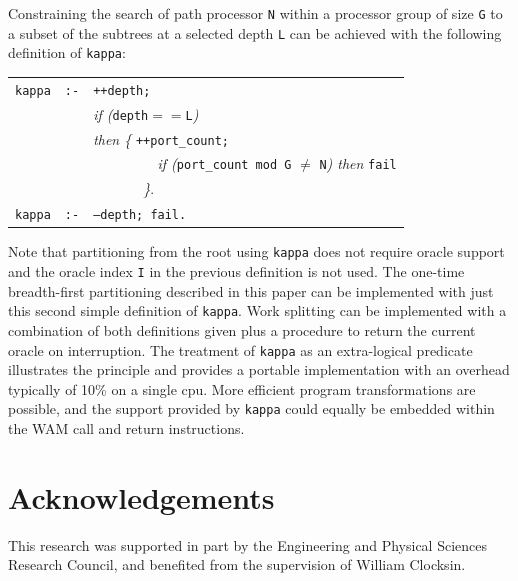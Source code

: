 \documentclass[a4paper,11pt,twoside]{article}
\begin{document}
Constraining the search of path processor \texttt{N} within a processor group of size \texttt{G}
to a subset of the subtrees at a selected depth \texttt{L}
can be achieved with the following definition of \texttt{kappa}:\\
\begin{tabular}{l l l}
\texttt{kappa} & \texttt{:-} & \texttt{++depth;} \\
 & & \textit{if (}\texttt{depth}$==$\texttt{L}\textit{)}\\
 & & \textit{then \{} \texttt{++port\_{}count;}\\
 & &           \textit{~~~~~~~~~if (}\texttt{port\_{}count mod G}
                   $\ne$ \texttt{N}\textit{) then} \texttt{fail}\\
 & &           \textit{~~~~~~~\}}.\\
\texttt{kappa} & \texttt{:-} & \texttt{--depth; fail.} \\
\end{tabular}

Note that partitioning from the root using \texttt{kappa} does not
require oracle support and the oracle index \texttt{I} in the previous
definition is not used.  The one-time breadth-first partitioning
described in this paper can be implemented with just this second
simple definition of \texttt{kappa}.  Work splitting can be
implemented with a combination of both definitions given plus a
procedure to return the current oracle on interruption.  The
treatment of \texttt{kappa} as an extra-logical predicate illustrates
the principle and provides a portable implementation with an overhead
typically of 10\% on a single cpu.  More efficient program
transformations are possible, and the support provided by
\texttt{kappa} could equally be embedded within the WAM call and
return instructions.

\section*{Acknowledgements} %

This research was supported in part by the Engineering and Physical
Sciences Research Council, and benefited from the
supervision of William Clocksin.
\end{document}

